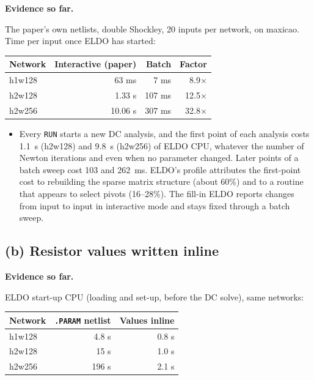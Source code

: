 \documentclass[11pt,a4paper]{article}
\newcommand{\evidence}{\par\noindent\textbf{Evidence so far.}\par}
\begin{document}
\evidence
The paper's own netlists, double Shockley, 20 inputs per network, on
maxicao. Time per input once ELDO has started:

\begin{center}
\small
\begin{tabular}{lrrr}
\toprule
Network & Interactive (paper) & Batch & Factor \\
\midrule
h1w128 & 63 ms   & 7 ms   & 8.9$\times$ \\
h2w128 & 1.33 s  & 107 ms & 12.5$\times$ \\
h2w256 & 10.06 s & 307 ms & 32.8$\times$ \\
\bottomrule
\end{tabular}
\end{center}

\begin{itemize}
\item Every \texttt{RUN} starts a new DC analysis, and the first
point of each analysis costs 1.1~s (h2w128) and 9.8~s (h2w256) of ELDO
CPU, whatever the number of Newton iterations and even when no parameter
changed. Later points of a batch sweep cost 103 and 262~ms. ELDO's
profile attributes the first-point cost to rebuilding the sparse matrix
structure (about 60\%) and to a routine that appears to select pivots
(16--28\%). The
fill-in ELDO reports changes from input to input in interactive mode and
stays fixed through a batch sweep.
\end{itemize}

\subsection*{(b) Resistor values written inline}

\evidence
ELDO start-up CPU (loading and set-up, before the DC solve), same networks:

\begin{center}
\small
\begin{tabular}{lrr}
\toprule
Network & \texttt{.PARAM} netlist & Values inline \\
\midrule
h1w128 & 4.8 s & 0.8 s \\
h2w128 & 15 s  & 1.0 s \\
h2w256 & 196 s & 2.1 s \\
\bottomrule
\end{tabular}
\end{center}
\end{document}
